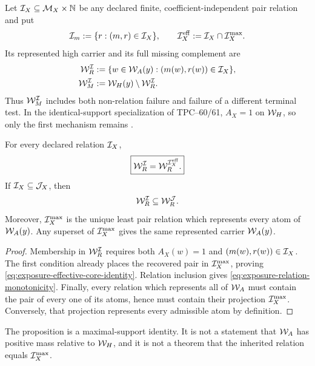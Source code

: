 Let \(\mathcal I_X\subseteq\mathcal M_X\times\mathbb N\) be any declared finite,
coefficient-independent pair relation and put
\begin{equation}
 \mathcal I_m:=\{r:(m,r)\in\mathcal I_X\},
 \qquad
 \mathcal I_X^{\rm eff}:=\mathcal I_X\cap\mathcal I_X^{\max}.
 \label{eq:exposure-effective-core}
\end{equation}
Its represented high carrier and its full missing complement are
\begin{align}
 \mathcal W_R^{\mathcal I}
 &:=\{w\in\mathcal W_A(y):(m(w),r(w))\in\mathcal I_X\},
 \label{eq:exposure-represented-carrier}\\
 \mathcal W_M^{\mathcal I}
 &:=\mathcal W_H(y)\setminus\mathcal W_R^{\mathcal I}.
 \label{eq:exposure-missing-carrier}
\end{align}
Thus \(\mathcal W_M^{\mathcal I}\) includes both non-relation failure and failure of a
different terminal test.  In the identical-support specialization of
TPC--60/61, \(A_X=1\) on \(\mathcal W_H\), so only the first mechanism remains
\citep{WangTPC60,WangTPC61}.

\begin{proposition}
\label{prop:exposure-effective-core}
For every declared relation \(\mathcal I_X\),
\begin{equation}
 \boxed{
 \mathcal W_R^{\mathcal I}
 =\mathcal W_R^{\mathcal I_X^{\rm eff}}.}
 \label{eq:exposure-effective-core-identity}
\end{equation}
If \(\mathcal I_X\subseteq\mathcal J_X\), then
\begin{equation}
 \mathcal W_R^{\mathcal I}\subseteq\mathcal W_R^{\mathcal J}.
 \label{eq:exposure-relation-monotonicity}
\end{equation}
Moreover, \(\mathcal I_X^{\max}\) is the unique least pair relation which
represents every atom of \(\mathcal W_A(y)\).  Any superset of
\(\mathcal I_X^{\max}\) gives the same represented carrier
\(\mathcal W_A(y)\).
\end{proposition}

\begin{proof}
Membership in \(\mathcal W_R^{\mathcal I}\) requires both \(A_X(w)=1\) and
\((m(w),r(w))\in\mathcal I_X\).  The first condition already places the recovered
pair in \(\mathcal I_X^{\max}\), proving
\eqref{eq:exposure-effective-core-identity}.  Relation inclusion gives
\eqref{eq:exposure-relation-monotonicity}.  Finally, every relation which
represents all of \(\mathcal W_A\) must contain the pair of every one of its
atoms, hence must contain their projection \(\mathcal I_X^{\max}\).  Conversely,
that projection represents every admissible atom by definition.
\end{proof}

The proposition is a maximal-support identity.  It is not a statement that
\(\mathcal W_A\) has positive mass relative to \(\mathcal W_H\), and it is not a theorem
that the inherited relation equals \(\mathcal I_X^{\max}\).

